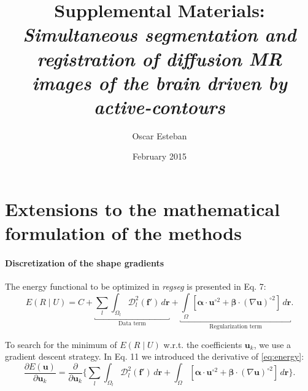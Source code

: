 \documentclass[a4paper]{report}
\providecommand{\mdist}[2]{ \mathcal{D}_{#2}^2(\mathbf{#1}) }
\renewcommand{\vec}[1]{\mathbf{#1}}
\begin{document}
\title{Supplemental Materials: \emph{Simultaneous segmentation and registration of
diffusion MR images of the brain driven by active-contours}}
\author{Oscar Esteban}
\date{February 2015}

\maketitle
\section{Extensions to the mathematical formulation of the methods}

\paragraph{Discretization of the shape gradients} The energy functional to be optimized
  in \emph{regseg} is presented in Eq. 7:
  \begin{equation}
  E(R \mid U) = C + \underbracket{\underset{l}{\sum} \int_{\Omega_l}
  \mdist{f'}{l} \,d\vec{r}}_{\text{Data term}}
  + \underbracket{\underset{\Omega}{\int} \left[ \boldsymbol{\alpha} \cdot \vec{u}^{\circ2}
  + \boldsymbol{\beta} \cdot (\nabla \vec{u})^{\circ2} \right] \,d\vec{r}}_{\text{Regularization term}}.
  \label{eq:energy}
  \end{equation}

To search for the minimum of $E(R \mid U)$ w.r.t. the coefficients $\vec{u}_k$, we use a gradient descent strategy.
In Eq. 11 we introduced the derivative of \eqref{eq:energy}:
  \begin{equation}
  \frac{\partial E(\vec{u})}{\partial \vec{u}_k} =
  \frac{ \partial }{\partial \vec{u}_k} \Big\{
  \underset{l}{\sum} \int_{\Omega_l} \mdist{f'}{l} \,d\vec{r}
  + \int_{\Omega} [ \boldsymbol{\alpha} \cdot \vec{u}^{\circ2}
  + \boldsymbol{\beta} \cdot (\nabla \vec{u})^{\circ2} ] \,d\vec{r}
  \Big\}.
  \label{eq:gradient_descent}
  \end{equation}
\end{document}
